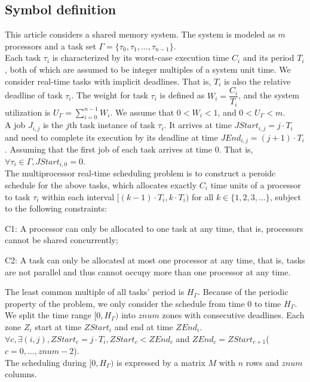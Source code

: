 \subsection{Symbol definition}
This article considers a shared memory system.
The system is modeled as $m$ processors and a task set $\Gamma = \{\tau_0, \tau_1, ..., \tau_{n-1} \}$. \\
Each task $\tau_i$ is characterized by its worst-case execution time $C_i$ and its period $T_i$, both of which are assumed to be integer multiples of a system unit time.
We consider real-time tasks with implicit deadlines.
That is, $T_i$ is also the relative deadline of task $\tau_i$.
The weight for task $\tau_i$ is defined as $W_i = \dfrac{C_i}{T_i}$, and the system utilization is $U_\Gamma = \sum\limits_{i=0}^{n-1} W_i$.
We assume that $0 < W_i < 1$, and $0 < U_\Gamma < m$. \\
A job $J_{i,j}$ is the $j$th task instance of task $\tau_i$. It arrives at time $JStart_{i,j} = j \cdot T_i$ and need to complete its execution by its deadline at time $JEnd_{i,j} = (j+1) \cdot T_i$.
Assuming that the first job of each task arrives at time 0.
That is, $\forall \tau_i \in \Gamma, JStart_{i,0} = 0$.  \\
The multiprocessor real-time scheduling problem is to construct a peroidc schedule for the above tasks, which allocates exactly $C_i$ time units of a processor to task $\tau_i$ within each interval $[(k-1) \cdot T_i, k \cdot T_i)$ for all $k \in \{1,2,3,...\}$, subject to the following constraints:
\begin{compactitem}
\item C1: A processor can only be allocated to one task at any time, that is, processors cannot be shared concurrently;
\item C2: A task can only be allocated at most one processor at any time, that is, tasks are not parallel and thus cannot occupy more than one processor at any time.
\end{compactitem}
The least common multiple of all tasks' period is $H_\Gamma$.
Because of the periodic property of the problem, we only consider the schedule from time 0 to time $H_\Gamma$.
We split the time range $[0, H_\Gamma)$ into $znum$ zones with consecutive deadlines.
Each zone $Z_i$ start at time $ZStart_i$ and end at time $ZEnd_i$.
$\forall c, \exists (i,j), ZStart_c = j \cdot T_i, ZStart_c < ZEnd_c$ and $ZEnd_c = ZStart_{c+1}$($c = 0,...,znum-2$). \\
The scheduling during $[0, H_\Gamma)$ is expressed by a matrix $M$ with $n$ rows and $znum$ columns.
